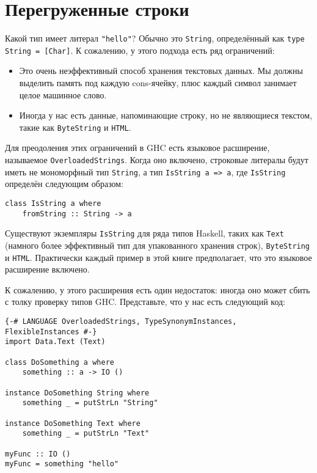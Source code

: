 \section{Перегруженные строки}

Какой тип имеет литерал \lstinline'"hello"'? Обычно это \lstinline'String',
определённый как \lstinline'type String = [Char]'. К сожалению, у этого подхода
есть ряд ограничений:
\begin{itemize}
    \item Это очень неэффективный способ хранения текстовых данных. Мы должны
        выделить память под каждую cons-ячейку, плюс каждый символ занимает
        целое машинное слово.
    \item Иногда у нас есть данные, напоминающие строку, но не являющиеся
        текстом, такие как \lstinline'ByteString' и \lstinline'HTML'.
\end{itemize}

Для преодоления этих ограничений в GHC есть языковое расширение, называемое
\lstinline'OverloadedStrings'. Когда оно включено, строковые литералы будут
иметь не мономорфный тип \lstinline'String', а тип \lstinline'IsString a => a',
где \lstinline'IsString' определён следующим образом:

\begin{lstlisting}
class IsString a where
    fromString :: String -> a
\end{lstlisting}

Существуют экземпляры \lstinline'IsString' для ряда типов Haskell, таких как
\lstinline'Text' (намного более эффективный тип для упакованного хранения
строк), \lstinline'ByteString' и \lstinline'HTML'. Практически каждый пример в
этой книге предполагает, что это языковое расширение включено.

К сожалению, у этого расширения есть один недостаток: иногда оно может сбить с
толку проверку типов GHC. Представьте, что у нас есть следующий код:

\begin{lstlisting}
{-# LANGUAGE OverloadedStrings, TypeSynonymInstances, FlexibleInstances #-}
import Data.Text (Text)

class DoSomething a where
    something :: a -> IO ()

instance DoSomething String where
    something _ = putStrLn "String"

instance DoSomething Text where
    something _ = putStrLn "Text"

myFunc :: IO ()
myFunc = something "hello"
\end{lstlisting}

